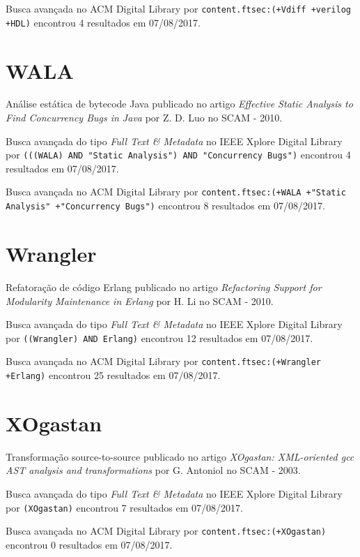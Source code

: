 Busca avançada no ACM Digital Library por
\texttt{content.ftsec:(+Vdiff +verilog +HDL)}
encontrou
4 resultados em
07/08/2017.

\section{WALA}

Análise estática de bytecode Java
publicado no artigo
{\it Effective Static Analysis to Find Concurrency Bugs in Java}
por
Z. D. Luo
no
SCAM
-
2010.

Busca avançada do tipo {\it Full Text \& Metadata} no IEEE Xplore Digital Library por
\texttt{(((WALA) AND "Static Analysis") AND "Concurrency Bugs")}
encontrou
4 resultados em
07/08/2017.

Busca avançada no ACM Digital Library por
\texttt{content.ftsec:(+WALA +"Static Analysis" +"Concurrency Bugs")}
encontrou
8 resultados em
07/08/2017.

\section{Wrangler}

Refatoração de código Erlang
publicado no artigo
{\it Refactoring Support for Modularity Maintenance in Erlang}
por
H. Li
no
SCAM
-
2010.

Busca avançada do tipo {\it Full Text \& Metadata} no IEEE Xplore Digital Library por
\texttt{((Wrangler) AND Erlang)}
encontrou
12 resultados em
07/08/2017.

Busca avançada no ACM Digital Library por
\texttt{content.ftsec:(+Wrangler +Erlang)}
encontrou
25 resultados em
07/08/2017.

\section{XOgastan}

Transformação source-to-source
publicado no artigo
{\it XOgastan: XML-oriented gcc AST analysis and transformations}
por
G. Antoniol
no
SCAM
-
2003.

Busca avançada do tipo {\it Full Text \& Metadata} no IEEE Xplore Digital Library por
\texttt{(XOgastan)}
encontrou
7 resultados em
07/08/2017.

Busca avançada no ACM Digital Library por
\texttt{content.ftsec:(+XOgastan)}
encontrou
0 resultados em
07/08/2017.


